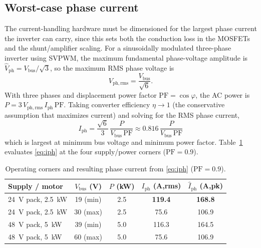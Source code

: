 \documentclass[journal,onecolumn,11pt]{IEEEtran}
\newcommand{\Vbus}{V_{\mathrm{bus}}}
\newcommand{\Iph}{I_{\mathrm{ph}}}
\begin{document}
\subsection{Worst-case phase current}\label{sec:iph}
The current-handling hardware must be dimensioned for the largest phase current the inverter can
carry, since this sets both the conduction loss in the MOSFETs and the shunt/amplifier scaling.
For a sinusoidally modulated three-phase inverter using SVPWM, the maximum fundamental phase-voltage
amplitude is $\hat V_{\mathrm{ph}}=\Vbus/\sqrt{3}$, so the maximum RMS phase voltage is
\begin{equation}
V_{\mathrm{ph,rms}}=\frac{\Vbus}{\sqrt{6}} .
\label{eq:vph}
\end{equation}
With three phases and displacement power factor $\mathrm{PF}=\cos\varphi$, the AC power is
$P = 3\,V_{\mathrm{ph,rms}}\,\Iph\,\mathrm{PF}$. Taking converter efficiency $\eta\!\to\!1$ (the
conservative assumption that maximizes current) and solving for the RMS phase current,
\begin{equation}
\boxed{\;\Iph = \frac{\sqrt{6}}{3}\,\frac{P}{\Vbus\,\mathrm{PF}}
        \approx 0.816\,\frac{P}{\Vbus\,\mathrm{PF}}\;}
\label{eq:iph}
\end{equation}
which is largest at minimum bus voltage and minimum power factor. Table~\ref{tab:env} evaluates
\eqref{eq:iph} at the four supply/power corners ($\mathrm{PF}=0.9$).

\begin{table}[!t]
\centering
\caption{Operating corners and resulting phase current from \eqref{eq:iph} ($\mathrm{PF}=0.9$).}
\label{tab:env}
\renewcommand{\arraystretch}{1.2}
\begin{tabular}{l c c c c}
\toprule
Supply / motor & $\Vbus$ (V) & $P$ (kW) & $\Iph$ (A,rms) & $\hat I_{\mathrm{ph}}$ (A,pk)\\
\midrule
\SI{24}{\volt} pack, \SI{2.5}{\kilo\watt} & 19 (min) & 2.5 & \textbf{119.4} & \textbf{168.8}\\
\SI{24}{\volt} pack, \SI{2.5}{\kilo\watt} & 30 (max) & 2.5 & 75.6 & 106.9\\
\SI{48}{\volt} pack, \SI{5}{\kilo\watt}   & 39 (min) & 5.0 & 116.3 & 164.5\\
\SI{48}{\volt} pack, \SI{5}{\kilo\watt}   & 60 (max) & 5.0 & 75.6 & 106.9\\
\bottomrule
\end{tabular}
\end{table}
\end{document}
